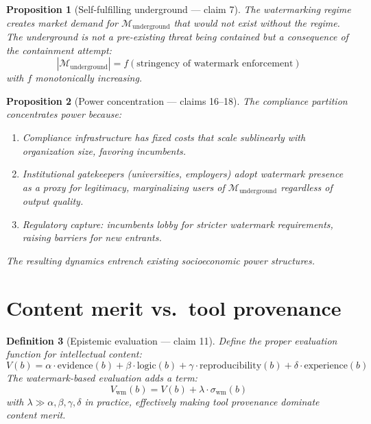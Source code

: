 \documentclass[11pt,a4paper]{article}
\newtheorem{definition}{Definition}[section]
\newtheorem{proposition}[definition]{Proposition}
\begin{document}
\begin{proposition}[Self-fulfilling underground --- claim 7]
\label{prop:self-fulfilling}
The watermarking regime creates market demand for $\mathcal{M}_{\text{underground}}$
that would not exist without the regime. The underground is not a pre-existing
threat being contained but a consequence of the containment attempt:
\[
  |\mathcal{M}_{\text{underground}}| = f(\text{stringency of watermark enforcement})
\]
with $f$ monotonically increasing.
\end{proposition}

\begin{proposition}[Power concentration --- claims 16--18]
\label{prop:power}
The compliance partition concentrates power because:
\begin{enumerate}
\item Compliance infrastructure has fixed costs that scale sublinearly
  with organization size, favoring incumbents.
\item Institutional gatekeepers (universities, employers) adopt watermark
  presence as a proxy for legitimacy, marginalizing users of
  $\mathcal{M}_{\text{underground}}$ regardless of output quality.
\item Regulatory capture: incumbents lobby for stricter watermark requirements,
  raising barriers for new entrants.
\end{enumerate}
The resulting dynamics entrench existing socioeconomic power structures.
\end{proposition}

\section{Content merit vs.\ tool provenance}
\label{sec:merit}

\begin{definition}[Epistemic evaluation --- claim 11]
\label{def:evaluation}
Define the proper evaluation function for intellectual content:
\[
  V(b) = \alpha \cdot \text{evidence}(b) + \beta \cdot \text{logic}(b)
         + \gamma \cdot \text{reproducibility}(b) + \delta \cdot \text{experience}(b)
\]
The watermark-based evaluation adds a term:
\[
  V_{\text{wm}}(b) = V(b) + \lambda \cdot \sigma_{\text{wm}}(b)
\]
with $\lambda \gg \alpha, \beta, \gamma, \delta$ in practice, effectively
making tool provenance dominate content merit.
\end{definition}
\end{document}
